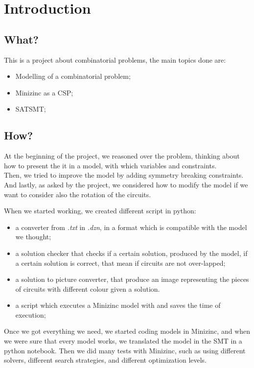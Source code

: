 \section{Introduction}
\subsection{What?}
This is a project about combinatorial problems, the main topics done are: 
\begin{itemize}
    \item Modelling of a combinatorial problem;
    \item Minizinc as a CSP;
    \item SAT\addslash SMT;
\end{itemize}
\subsection{How?}
At the beginning of the project, we reasoned over the problem, thinking about how to present the it in a model, with which variables and constraints.\\
Then, we tried to improve the model by adding symmetry breaking constraints. And lastly, as asked by the project, we considered how to modify the model if we want to consider also the rotation of the circuits.

When we started working, we created different script in python:
\begin{itemize}
    \item a converter from \emph{.txt} in \emph{.dzn}, in a format which is compatible with the model we thought;
    \item a solution checker that checks if a certain solution, produced by the model, if a certain solution is correct, that mean if circuits are not over-lapped;
    \item a solution to picture converter, that produce an image representing the pieces of circuits with different colour given a solution. 
    \item a script which executes a Minizinc model with and saves the time of execution;
\end{itemize}
Once we got everything we need, we started coding models in Minizinc, and when we were sure that every model works, we translated the model in the SMT in a python notebook. 
Then we did many tests with Minizinc, such as using different solvers, different search strategies, and different optimization levels. 

